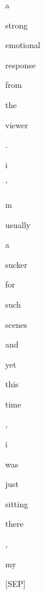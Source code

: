 \documentclass[varwidth=150mm]{standalone}
\begin{document}
\begin{CJK*}{UTF8}{gbsn}
{{{\colorbox{red!2.8474314212799072}{\strut a} \colorbox{red!1.4034130573272705}{\strut strong} \colorbox{red!3.737532138824463}{\strut emotional} \colorbox{red!3.9498164653778076}{\strut response} \colorbox{red!0.0}{\strut from} \colorbox{red!2.7019410133361816}{\strut the} \colorbox{red!11.741786003112793}{\strut viewer} \colorbox{red!0.0}{\strut .} \colorbox{red!4.874400615692139}{\strut i} \colorbox{red!0.0}{\strut '} \colorbox{red!1.4136282205581665}{\strut m} \colorbox{red!0.0}{\strut usually} \colorbox{red!0.0}{\strut a} \colorbox{red!0.0}{\strut sucker} \colorbox{red!0.0}{\strut for} \colorbox{red!2.097522497177124}{\strut such} \colorbox{red!100.0}{\strut scenes} \colorbox{red!3.650244951248169}{\strut and} \colorbox{red!7.071376323699951}{\strut yet} \colorbox{red!0.0}{\strut this} \colorbox{red!4.361106872558594}{\strut time} \colorbox{red!1.3315593004226685}{\strut ,} \colorbox{red!6.5776591300964355}{\strut i} \colorbox{red!5.940706729888916}{\strut was} \colorbox{red!3.3767571449279785}{\strut just} \colorbox{red!6.698978900909424}{\strut sitting} \colorbox{red!2.24936842918396}{\strut there} \colorbox{red!6.780761241912842}{\strut ,} \colorbox{red!7.245161056518555}{\strut my} \colorbox{red!3.659782886505127}{\strut [SEP]}
}}}
\end{CJK*}
\end{document}
